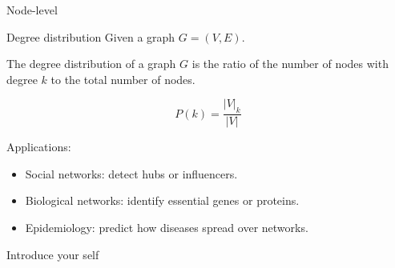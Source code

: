     \begin{frame}{Node-level}
        \begin{exampleblock}{Degree distribution}
            Given a graph $G = (V, E)$.
            
            The degree distribution of a graph $G$ is the ratio of the number of nodes with degree $k$ to the total number of nodes.
        \end{exampleblock}

        \begin{equation}
            P(k) = \frac{|V|_{k}}{|V|}
        \end{equation}
        
        Applications:
        \begin{itemize}
            \item Social networks: detect hubs or influencers.
            \item Biological networks:  identify essential genes or proteins.
            \item Epidemiology: predict how diseases spread over networks.
        \end{itemize}

        \begin{note}
            {Introduce your self}
        \end{note}
    \end{frame}

